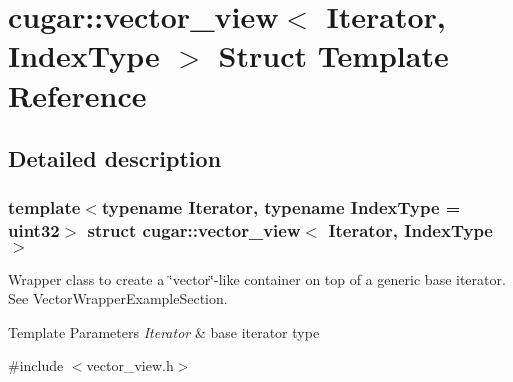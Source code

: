 \hypertarget{structcugar_1_1vector__view}{}\section{cugar\+:\+:vector\+\_\+view$<$ Iterator, Index\+Type $>$ Struct Template Reference}
\label{structcugar_1_1vector__view}


\subsection{Detailed description}
\subsubsection*{template$<$typename Iterator, typename Index\+Type = uint32$>$\newline
struct cugar\+::vector\+\_\+view$<$ Iterator, Index\+Type $>$}

Wrapper class to create a \char`\"{}vector\char`\"{}-\/like container on top of a generic base iterator. See Vector\+Wrapper\+Example\+Section.


\begin{DoxyTemplParams}{Template Parameters}
{\em Iterator} & base iterator type \\
\hline
\end{DoxyTemplParams}


{\ttfamily \#include $<$vector\+\_\+view.\+h$>$}

